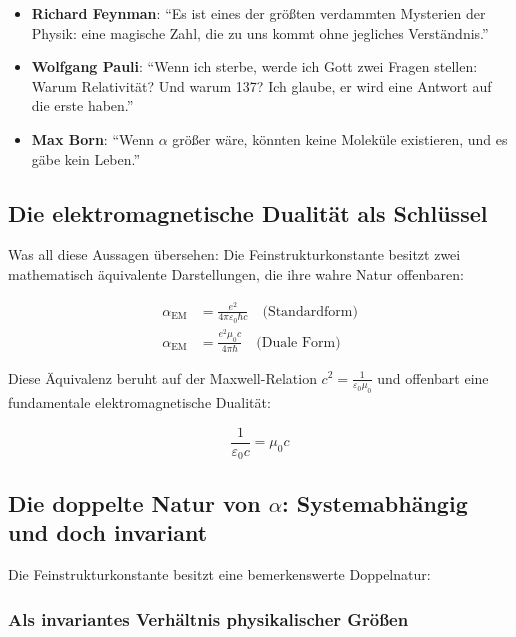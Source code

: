 \documentclass[12pt,a4paper]{article}
\begin{document}
\begin{itemize}
	\item \textbf{Richard Feynman}: ``Es ist eines der größten verdammten Mysterien der Physik: eine magische Zahl, die zu uns kommt ohne jegliches Verständnis.''
	\item \textbf{Wolfgang Pauli}: ``Wenn ich sterbe, werde ich Gott zwei Fragen stellen: Warum Relativität? Und warum 137? Ich glaube, er wird eine Antwort auf die erste haben.''
	\item \textbf{Max Born}: ``Wenn $\alpha$ größer wäre, könnten keine Moleküle existieren, und es gäbe kein Leben.''
\end{itemize}

\subsection{Die elektromagnetische Dualität als Schlüssel}
\label{subsec:electromagnetic_duality}

Was all diese Aussagen übersehen: Die Feinstrukturkonstante besitzt zwei mathematisch äquivalente Darstellungen, die ihre wahre Natur offenbaren:

\begin{align}
	\alpha_{\text{EM}} &= \frac{e^2}{4\pi\varepsilon_0\hbar c} \quad \text{(Standardform)} \label{eq:alpha_standard}\\
	\alpha_{\text{EM}} &= \frac{e^2 \mu_0 c}{4\pi \hbar} \quad \text{(Duale Form)} \label{eq:alpha_dual}
\end{align}

Diese Äquivalenz beruht auf der Maxwell-Relation $c^2 = \frac{1}{\varepsilon_0\mu_0}$ und offenbart eine fundamentale elektromagnetische Dualität:

\begin{equation}
	\frac{1}{\varepsilon_0 c} = \mu_0 c
	\label{eq:em_duality}
\end{equation}

\subsection{Die doppelte Natur von $\alpha$: Systemabhängig und doch invariant}
\label{subsec:double_nature}

Die Feinstrukturkonstante besitzt eine bemerkenswerte Doppelnatur:

\subsubsection{Als invariantes Verhältnis physikalischer Größen}
\label{subsubsec:invariant_ratio}
\end{document}
